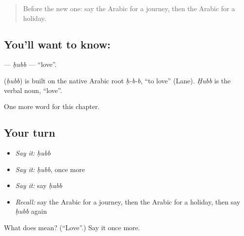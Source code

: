 \begin{quote}
Before the new one: say the Arabic for a journey, then the Arabic for a holiday.
\end{quote}

\subsection*{You'll want to know: }
\textbf{} — \emph{ḥubb} — \textquotedblleft{}love\textquotedblright{}.

\begin{cousinweb}
\textbf{} (\emph{ḥubb}) is built on the native Arabic root \emph{ḥ-b-b}, \textquotedblleft{}to love\textquotedblright{} (Lane). \emph{Ḥubb} is the verbal noun, \textquotedblleft{}love\textquotedblright{}.
\end{cousinweb}

\begin{grammarlens}[title={What you've built}]
One more word for this chapter.
\end{grammarlens}

\subsection*{Your turn}
\begin{itemize}
\raggedright
  \item \emph{Say it:} \emph{ḥubb}
  \item \emph{Say it:} \emph{ḥubb}, once more
  \item \emph{Say it:} say \emph{ḥubb}
  \item \emph{Recall:} say the Arabic for a journey, then the Arabic for a holiday, then say \emph{ḥubb} again
\end{itemize}

\begin{tcolorbox}[breakable,colback=teal!4,colframe=teal!35!black,title={Before you move on}]
What does  mean? (\textquotedblleft{}Love\textquotedblright{}.) Say it once more.
\end{tcolorbox}
